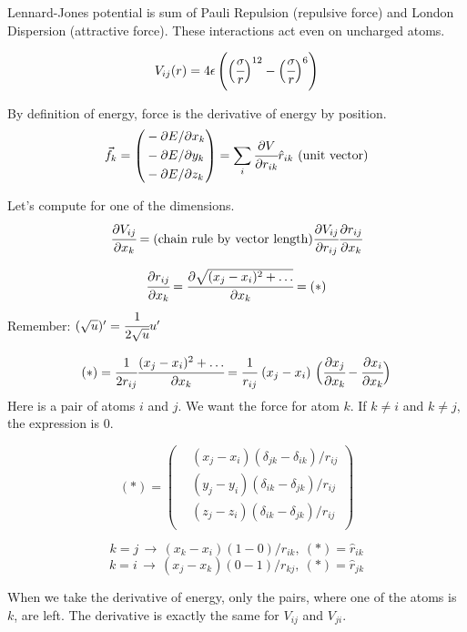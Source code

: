 \documentclass[12pt,a4paper]{article}
\newcommand{\infers}{\,\to\,}
\newcommand{\mat}[1]{\vec{#1}}
\newcommand{\framed}[1]{\tikz[baseline=(char.base)]{\node[shape=rectangle,draw,inner sep=4pt] (char) {#1};}}
\begin{document}
Lennard-Jones potential \cite{lennard-jones} is sum of Pauli Repulsion (repulsive force) and London Dispersion (attractive force). These interactions act even on uncharged atoms.

\[
V_{ij}(r) = 4\epsilon \left( \Bigl(\cfrac{\sigma}{r}\Bigr)^{12} - \Bigl(\cfrac{\sigma}{r}\Bigr)^{6} \right)
\]

By definition of energy, force is the derivative of energy by position.
\[
\mat{f}_k = \left( \begin{aligned}
	& - \partial E / \partial x_k \\
	& - \partial E / \partial y_k \\
	& - \partial E / \partial z_k \\
\end{aligned} \right) = \sum_i \cfrac{\partial V}{\partial r_{ik}} {\hat r_{ik}} \text{\ (unit vector)}
\]

Let's compute for one of the dimensions.
\[
\cfrac{\partial V_{ij}}{\partial x_k} = \text{(chain rule by vector length)} \cfrac{\partial V_{ij}}{\partial r_{ij}} \cfrac{\partial r_{ij}}{\partial x_k}
\]

\[ \cfrac{\partial r_{ij}}{\partial x_k} = \cfrac{\partial \sqrt{(x_j-x_i)^2 + \ldots}}{\partial x_k} = (*) \]
Remember: \( (\sqrt{u})' = \cfrac{1}{2\sqrt{u}} u' \)

\[
(*) = \cfrac{1}{2r_{ij}} \cfrac{(x_j-x_i)^2+\ldots}{\partial x_k} = \cfrac{1}{r_{ij}} \ (x_j-x_i) \ \Bigl(\cfrac{\partial x_j}{\partial x_k} - \cfrac{\partial x_i}{\partial x_k}\Bigr)
\]
Here is a pair of atoms $i$ and $j$. We want the force for atom $k$. If \(k\neq i\) and \(k\neq j\), the expression is 0.

\[
(*) = \left( \begin{aligned}
	& (x_j - x_i) (\delta_{jk} - \delta_{ik}) / r_{ij} \\
	& (y_j - y_i) (\delta_{ik} - \delta_{jk}) / r_{ij} \\
	& (z_j - z_i) (\delta_{ik} - \delta_{jk}) / r_{ij} \\
\end{aligned} \right) 
\]

\[
k=j \infers (x_k-x_i)(1-0)/r_{ik},\ (*) = {\hat r_{ik}}
\]
\[
k=i \infers (x_j-x_k)(0-1)/r_{kj},\ (*) = {\hat r_{jk}}
\]

When we take the derivative of energy, only the pairs, where one of the atoms is \(k\), are left. The derivative is exactly the same for \(V_{ij}\) and \(V_{ji}\).

{\centering\framed{ \( \mat{f}_k = - \sum_i \cfrac{\partial V}{\partial r} {\hat r_{ik}} \) }\\}
\end{document}
